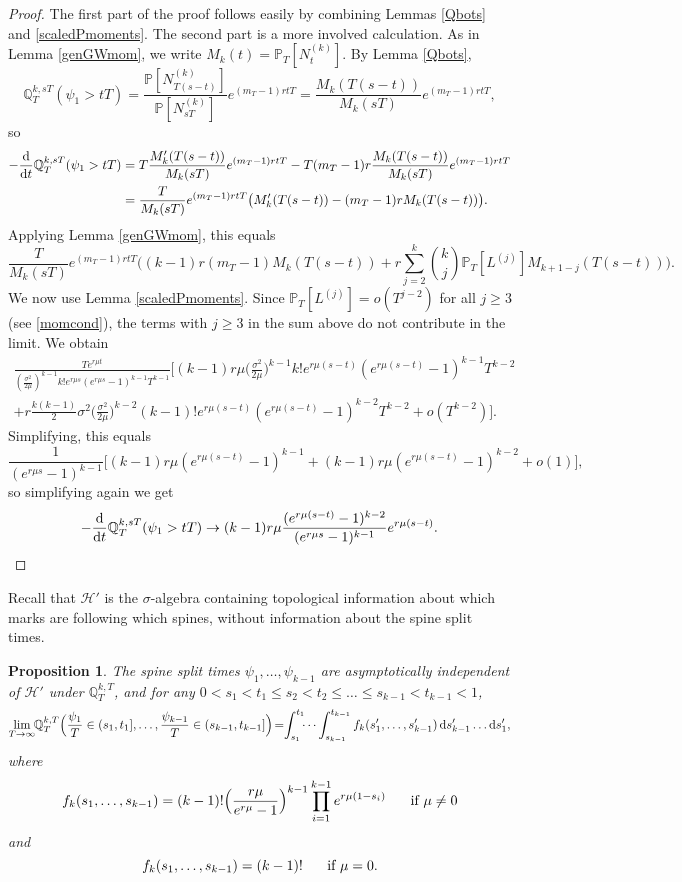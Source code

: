 \documentclass{article}
\theoremstyle{plain}
\newtheorem{prop}[thm]{Proposition}
\theoremstyle{definition}
\newcommand{\Q}{\mathbb{Q}}
\renewcommand{\P}{\mathbb{P}}
\renewcommand{\d}{{\rm{d}}}
\begin{document}
\begin{proof}
The first part of the proof follows easily by combining Lemmas \ref{Qbots} and \ref{scaledPmoments}. The second part is a more involved calculation. As in Lemma \ref{genGWmom}, we write $M_k(t) = \P_T[N_t^{(k)}]$. By Lemma \ref{Qbots},
\[\Q^{k,sT}_T(\psi_1 > tT) = \frac{\P[N^{(k)}_{T(s-t)}]}{\P[N^{(k)}_{sT}]} e^{(m_T-1)rtT} = \frac{M_k(T(s-t))}{M_k(sT)} e^{(m_T-1)rtT},\]
so
\begin{align*}
-\frac{\d}{\d t}\Q^{k,sT}_T(\psi_1 > tT) &= T\frac{M_k'(T(s-t))}{M_k(sT)} e^{(m_T-1)rtT} - T(m_T-1)r \frac{M_k(T(s-t))}{M_k(sT)} e^{(m_T-1)rtT}\\
&= \frac{T}{M_k(sT)}e^{(m_T-1)rtT} \big(M_k'(T(s-t)) - (m_T-1)r M_k(T(s-t))\big).
\end{align*}
Applying Lemma \ref{genGWmom}, this equals
\[\frac{T}{M_k(sT)}e^{(m_T-1)rtT} \bigg( (k-1)r(m_T-1) M_k(T(s-t)) + r\sum_{j=2}^k \binom{k}{j}\P_T[L^{(j)}]M_{k+1-j}(T(s-t))\bigg).\]
We now use Lemma \ref{scaledPmoments}. Since $\P_T[L^{(j)}] = o(T^{j-2})$ for all $j\ge 3$ (see \eqref{momcond}), the terms with $j\ge 3$ in the sum above do not contribute in the limit. We obtain
\begin{multline*}
\frac{Te^{r\mu t}}{(\frac{\sigma^2}{2\mu})^{k-1}k! e^{r\mu s}(e^{r\mu s}-1)^{k-1}T^{k-1}}\bigg[(k-1)r\mu\Big(\frac{\sigma^2}{2\mu}\Big)^{k-1}k!e^{r\mu(s-t)}(e^{r\mu(s-t)}-1)^{k-1}T^{k-2}\\ + r\frac{k(k-1)}{2}\sigma^2 \Big(\frac{\sigma^2}{2\mu}\Big)^{k-2}(k-1)!e^{r\mu(s-t)}(e^{r\mu(s-t)}-1)^{k-2}T^{k-2} + o(T^{k-2})\bigg].
\end{multline*}
Simplifying, this equals
\[\frac{1}{(e^{r\mu s}-1)^{k-1}}\bigg[(k-1)r\mu (e^{r\mu(s-t)}-1)^{k-1} + (k-1)r\mu (e^{r\mu(s-t)}-1)^{k-2} + o(1)\bigg],\]
so simplifying again we get
\[-\frac{\d}{\d t}\Q^{k,sT}_T(\psi_1 > tT) \to (k-1)r\mu \frac{(e^{r\mu(s-t)}-1)^{k-2}}{(e^{r\mu s}-1)^{k-1}} e^{r\mu(s-t)}.\qedhere\]
\end{proof}


Recall that $\mathcal H'$ is the $\sigma$-algebra containing topological information about which marks are following which spines, without information about the spine split times.


\begin{prop}\label{almostdensity}
The spine split times $\psi_1,\ldots,\psi_{k-1}$ are asymptotically independent of $\mathcal H'$ under $\Q^{k,T}_T$, and for any $0<s_1<t_1\le s_2<t_2\le \ldots \le s_{k-1}<t_{k-1}< 1$,
\[\lim_{T\to\infty} \hspace{-1mm} \Q^{k,T}_T\Big(\frac{\psi_1}{T}\in (s_1,t_1],\ldots, \frac{\psi_{k-1}}{T}\in (s_{k-1},t_{k-1}]\Big) \hspace{-0.5mm} = \hspace{-1mm} \int_{s_1}^{t_1}\hspace{-1.5mm}\cdots \int_{s_{k-1}}^{t_{k-1}} f_k(s_1',\ldots,s_{k-1}')\, \d s_{k-1}'\ldots\d s_1',\]
where
\[f_k(s_1,\ldots,s_{k-1}) = (k-1)! \Big(\frac{r\mu}{e^{r\mu}-1}\Big)^{k-1} \prod_{i=1}^{k-1} e^{r\mu(1-s_i)} \hspace{5mm} \hbox{ if } \mu\neq 0\]
and
\[f_k(s_1,\ldots,s_{k-1}) = (k-1)! \hspace{5mm} \hbox{ if } \mu=0.\]
\end{prop}
\end{document}
